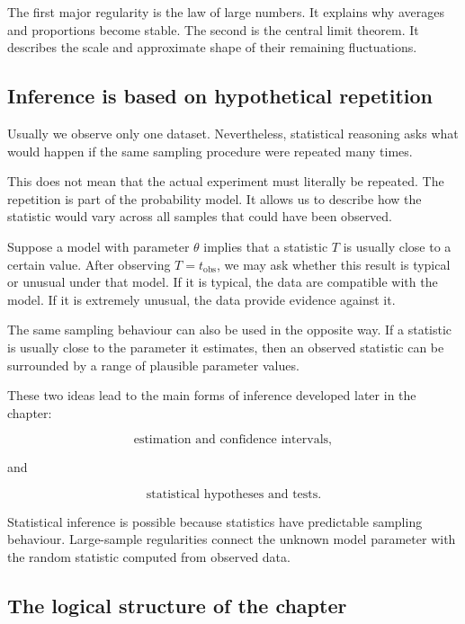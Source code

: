 The first major regularity is the law of large numbers. It explains why averages
and proportions become stable. The second is the central limit theorem. It
describes the scale and approximate shape of their remaining fluctuations.

\subsection*{Inference is based on hypothetical repetition}

Usually we observe only one dataset. Nevertheless, statistical reasoning asks
what would happen if the same sampling procedure were repeated many times.

This does not mean that the actual experiment must literally be repeated. The
repetition is part of the probability model. It allows us to describe how the
statistic would vary across all samples that could have been observed.

Suppose a model with parameter \(\theta\) implies that a statistic \(T\) is
usually close to a certain value. After observing \(T=t_{\mathrm{obs}}\), we may
ask whether this result is typical or unusual under that model. If it is typical,
the data are compatible with the model. If it is extremely unusual, the data
provide evidence against it.

The same sampling behaviour can also be used in the opposite way. If a statistic
is usually close to the parameter it estimates, then an observed statistic can
be surrounded by a range of plausible parameter values.

These two ideas lead to the main forms of inference developed later in the
chapter:

\[
\text{estimation and confidence intervals},
\]

and

\[
\text{statistical hypotheses and tests}.
\]

\begin{theorembox}
Statistical inference is possible because statistics have predictable sampling
behaviour. Large-sample regularities connect the unknown model parameter with the
random statistic computed from observed data.
\end{theorembox}

\subsection*{The logical structure of the chapter}

